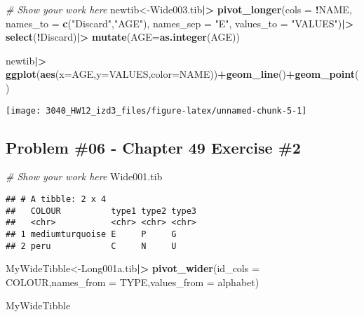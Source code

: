 \documentclass[
]{article}
\newenvironment{Shaded}{\begin{snugshade}}{\end{snugshade}}
\newcommand{\AttributeTok}[1]{\textcolor[rgb]{0.13,0.29,0.53}{#1}}
\newcommand{\CommentTok}[1]{\textcolor[rgb]{0.56,0.35,0.01}{\textit{#1}}}
\newcommand{\FunctionTok}[1]{\textcolor[rgb]{0.13,0.29,0.53}{\textbf{#1}}}
\newcommand{\NormalTok}[1]{#1}
\newcommand{\OtherTok}[1]{\textcolor[rgb]{0.56,0.35,0.01}{#1}}
\newcommand{\SpecialCharTok}[1]{\textcolor[rgb]{0.81,0.36,0.00}{\textbf{#1}}}
\newcommand{\StringTok}[1]{\textcolor[rgb]{0.31,0.60,0.02}{#1}}
\begin{document}
\begin{Shaded}
\begin{Highlighting}[]
\CommentTok{\# Show your work here}
\NormalTok{newtib}\OtherTok{\textless{}{-}}\NormalTok{Wide003.tib}\SpecialCharTok{|\textgreater{}}
  \FunctionTok{pivot\_longer}\NormalTok{(}\AttributeTok{cols =} \SpecialCharTok{!}\NormalTok{NAME,}
               \AttributeTok{names\_to =} \FunctionTok{c}\NormalTok{(}\StringTok{"Discard"}\NormalTok{,}\StringTok{"AGE"}\NormalTok{),}
               \AttributeTok{names\_sep =} \StringTok{"E"}\NormalTok{,}
               \AttributeTok{values\_to =} \StringTok{"VALUES"}\NormalTok{)}\SpecialCharTok{|\textgreater{}}
  \FunctionTok{select}\NormalTok{(}\SpecialCharTok{!}\NormalTok{Discard)}\SpecialCharTok{|\textgreater{}}
  \FunctionTok{mutate}\NormalTok{(}\AttributeTok{AGE=}\FunctionTok{as.integer}\NormalTok{(AGE))}

\NormalTok{newtib}\SpecialCharTok{|\textgreater{}}
  \FunctionTok{ggplot}\NormalTok{(}\FunctionTok{aes}\NormalTok{(}\AttributeTok{x=}\NormalTok{AGE,}\AttributeTok{y=}\NormalTok{VALUES,}\AttributeTok{color=}\NormalTok{NAME))}\SpecialCharTok{+}\FunctionTok{geom\_line}\NormalTok{()}\SpecialCharTok{+}\FunctionTok{geom\_point}\NormalTok{()}
\end{Highlighting}
\end{Shaded}

\texttt{[image: 3040\_HW12\_izd3\_files/figure-latex/unnamed-chunk-5-1]}

\newpage

\hypertarget{problem-06---chapter-49-exercise-2}{%
\subsection{Problem \#06 - Chapter 49 Exercise
\#2}\label{problem-06---chapter-49-exercise-2}}

\begin{Shaded}
\begin{Highlighting}[]
\CommentTok{\# Show your work here}
\NormalTok{Wide001.tib}
\end{Highlighting}
\end{Shaded}

\begin{verbatim}
## # A tibble: 2 x 4
##   COLOUR          type1 type2 type3
##   <chr>           <chr> <chr> <chr>
## 1 mediumturquoise E     P     G    
## 2 peru            C     N     U
\end{verbatim}

\begin{Shaded}
\begin{Highlighting}[]
\NormalTok{MyWideTibble}\OtherTok{\textless{}{-}}\NormalTok{Long001a.tib}\SpecialCharTok{|\textgreater{}}
  \FunctionTok{pivot\_wider}\NormalTok{(}\AttributeTok{id\_cols =}\NormalTok{ COLOUR,}\AttributeTok{names\_from =}\NormalTok{ TYPE,}\AttributeTok{values\_from =}\NormalTok{ alphabet)}

\NormalTok{MyWideTibble}
\end{Highlighting}
\end{Shaded}
\end{document}
